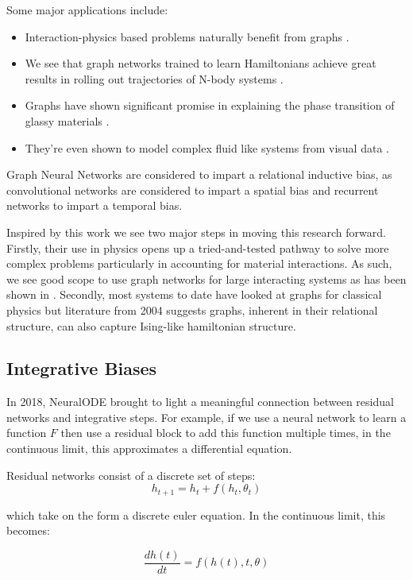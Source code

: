 \documentclass{article}
\begin{document}
Some major applications include:
\begin{itemize}
\item Interaction-physics based problems naturally benefit from graphs \cite{battaglia_relational_2018}. 
\item We see that graph networks trained to learn Hamiltonians achieve great results in rolling out trajectories of N-body systems \cite{sanchez-gonzalez_hamiltonian_2019}. 
\item Graphs have shown significant promise in explaining the phase transition of glassy materials \cite{bapst_unveiling_2020}. 
\item They're even shown to model complex fluid like systems from visual data \cite{sanchez-gonzalez_learning_2020}. 
\end{itemize}

Graph Neural Networks are considered to impart a relational inductive bias, as convolutional networks are considered to impart a spatial bias and recurrent networks to impart a temporal bias. 

Inspired by this work we see two major steps in moving this research forward. Firstly, their use in physics opens up a tried-and-tested pathway to solve more complex problems particularly in accounting for material interactions. As such, we see good scope to use graph networks for large interacting systems as has been shown in \cite{sanchez-gonzalez_learning_2020}. Secondly, most systems to date have looked at graphs for classical physics but literature from 2004 suggests graphs, inherent in their relational structure, can also capture Ising-like hamiltonian structure.


\subsection{Integrative Biases}

In 2018, NeuralODE brought to light a meaningful connection between residual networks and integrative steps. For example, if we use a neural network to learn a function $F$ then use a residual block to add this function multiple times, in the continuous limit, this approximates a differential equation.

Residual networks consist of a discrete set of steps:
$$ h_{t+1} = h_t + f(h_t,\theta_t) $$

which take on the form a discrete euler equation. In the continuous limit, this becomes:

$$ \frac{dh(t)}{dt} = f(h(t),t,\theta) $$
\end{document}
